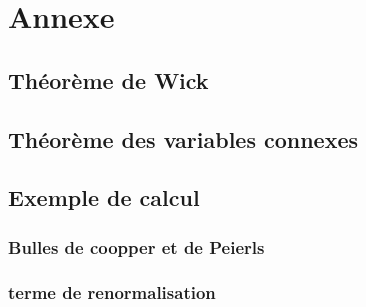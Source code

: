 \chapter{Annexe}
\section{Théorème de Wick}
\section{Théorème des variables connexes}
\section{Exemple de calcul}
\subsection{Bulles de  coopper et de Peierls}
\subsection{terme de renormalisation}
